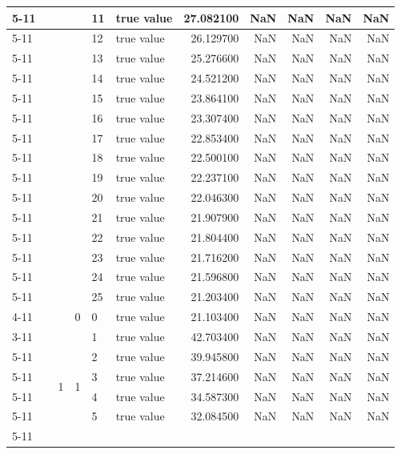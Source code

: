 \begin{tabular}{llllllrrrrr}
\cline{5-11}
 &  &  &  & 11 & true value & 27.082100 & NaN & NaN & NaN & NaN \\
\cline{5-11}
 &  &  &  & 12 & true value & 26.129700 & NaN & NaN & NaN & NaN \\
\cline{5-11}
 &  &  &  & 13 & true value & 25.276600 & NaN & NaN & NaN & NaN \\
\cline{5-11}
 &  &  &  & 14 & true value & 24.521200 & NaN & NaN & NaN & NaN \\
\cline{5-11}
 &  &  &  & 15 & true value & 23.864100 & NaN & NaN & NaN & NaN \\
\cline{5-11}
 &  &  &  & 16 & true value & 23.307400 & NaN & NaN & NaN & NaN \\
\cline{5-11}
 &  &  &  & 17 & true value & 22.853400 & NaN & NaN & NaN & NaN \\
\cline{5-11}
 &  &  &  & 18 & true value & 22.500100 & NaN & NaN & NaN & NaN \\
\cline{5-11}
 &  &  &  & 19 & true value & 22.237100 & NaN & NaN & NaN & NaN \\
\cline{5-11}
 &  &  &  & 20 & true value & 22.046300 & NaN & NaN & NaN & NaN \\
\cline{5-11}
 &  &  &  & 21 & true value & 21.907900 & NaN & NaN & NaN & NaN \\
\cline{5-11}
 &  &  &  & 22 & true value & 21.804400 & NaN & NaN & NaN & NaN \\
\cline{5-11}
 &  &  &  & 23 & true value & 21.716200 & NaN & NaN & NaN & NaN \\
\cline{5-11}
 &  &  &  & 24 & true value & 21.596800 & NaN & NaN & NaN & NaN \\
\cline{5-11}
 &  &  &  & 25 & true value & 21.203400 & NaN & NaN & NaN & NaN \\
\cline{4-11} \cline{5-11}
 &  &  & 0 & 0 & true value & 21.103400 & NaN & NaN & NaN & NaN \\
\cline{3-11} \cline{4-11} \cline{5-11}
 &  & \multirow[t]{101}{*}{1} & \multirow[t]{25}{*}{1} & 1 & true value & 42.703400 & NaN & NaN & NaN & NaN \\
\cline{5-11}
 &  &  &  & 2 & true value & 39.945800 & NaN & NaN & NaN & NaN \\
\cline{5-11}
 &  &  &  & 3 & true value & 37.214600 & NaN & NaN & NaN & NaN \\
\cline{5-11}
 &  &  &  & 4 & true value & 34.587300 & NaN & NaN & NaN & NaN \\
\cline{5-11}
 &  &  &  & 5 & true value & 32.084500 & NaN & NaN & NaN & NaN \\
\cline{5-11}

\end{tabular}
